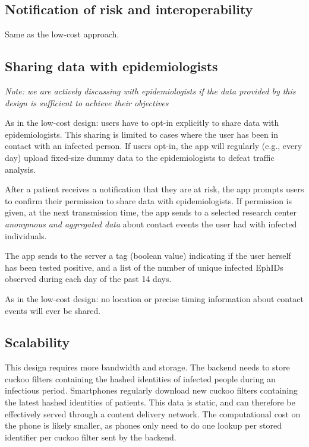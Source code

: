 \documentclass[10.8pt,a4paper]{article}
\begin{document}
\subsection{Notification of risk and interoperability}

Same as the low-cost approach.

\subsection{Sharing data with epidemiologists}

\emph{Note: we are actively discussing with epidemiologists if the data provided by this design is sufficient to achieve their objectives}

As in the low-cost design: users have to opt-in explicitly to share data with epidemiologists. This sharing is limited to cases where the user has been in contact with an infected person. If users opt-in, the app will regularly (e.g., every day) upload fixed-size dummy data to the epidemiologists to defeat traffic analysis.

After a patient receives a notification that they are at risk, the app prompts users to confirm their permission to share data with epidemiologists. If permission is given, at the next transmission time, the app sends  to a selected research center \emph{ anonymous and aggregated data} about contact events the user had with infected individuals.

The app sends to the server a tag (boolean value) indicating if the user herself has been tested positive, and a list of the  number of unique infected  EphIDs  observed during each day of the past 14 days.

As in the low-cost design: no location or precise timing information about contact events will ever be shared.

\subsection{Scalability}

This design requires more bandwidth and storage. The backend needs to store cuckoo filters containing the hashed identities of infected people during an infectious period. Smartphones regularly download new cuckoo filters containing the latest hashed identities of patients. This data is static, and can therefore be effectively served through a content delivery network. The computational cost on the phone is likely smaller, as phones only need to do one lookup per stored identifier per cuckoo filter sent by the backend.
\end{document}
